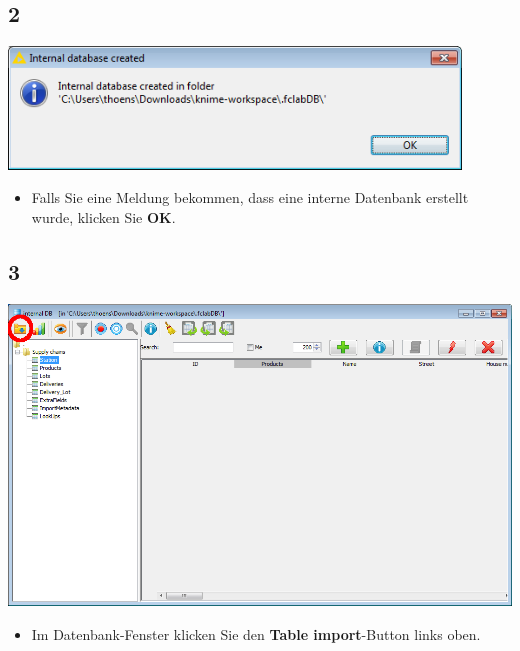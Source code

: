 \documentclass{beamer}
\begin{document}
\subsection{2}
\begin{frame}
	\begin{center}
  		\includegraphics[width=0.9\textwidth]{2.png}
	\end{center}
	\begin{itemize}
		\item Falls Sie eine Meldung bekommen, dass eine interne Datenbank erstellt wurde, klicken Sie \textbf{OK}.
	\end{itemize}
\end{frame}

\subsection{3}
\begin{frame}
	\begin{center}
  		\includegraphics[height=0.6\textheight]{3.png}
	\end{center}
	\begin{itemize}
		\item Im Datenbank-Fenster klicken Sie den \textbf{Table import}-Button links oben.
	\end{itemize}
\end{frame}
\end{document}
